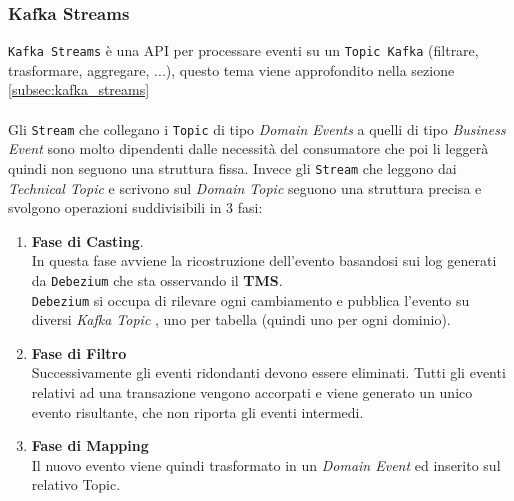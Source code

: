 \subsubsection{Kafka Streams}
\label{subsubsec:kafka_stream}
\texttt{Kafka Streams} è una API per processare eventi su un \texttt{Topic Kafka} (filtrare, trasformare, aggregare, ...), questo tema viene approfondito nella sezione \ref{subsec:kafka_streams}\\
\\
Gli \texttt{Stream} che collegano i \texttt{Topic} di tipo \textit{Domain Events} a quelli di tipo \textit{Business Event} sono molto dipendenti dalle necessità del consumatore che poi li leggerà quindi non seguono una struttura fissa.
Invece gli \texttt{Stream} che leggono dai \textit{Technical Topic} e scrivono sul \textit{Domain Topic} seguono una struttura precisa e svolgono operazioni suddivisibili in 3 fasi:
\begin{enumerate}
    \item \textbf{Fase di Casting}.\\
    In questa fase avviene la ricostruzione dell'evento basandosi sui log generati da \texttt{Debezium} che sta osservando il \textbf{TMS}.\\
    \texttt{Debezium} si occupa di rilevare ogni cambiamento e pubblica l'evento su diversi \textit{Kafka Topic} , uno per tabella (quindi uno per ogni dominio). 
    \item \textbf{Fase di Filtro}\\
    Successivamente gli eventi ridondanti devono essere eliminati. Tutti gli eventi relativi ad una transazione vengono accorpati e viene generato un unico evento risultante, che non riporta gli eventi intermedi. 
    \item \textbf{Fase di Mapping}\\
    Il nuovo evento viene quindi trasformato in un \textit{Domain Event} ed inserito sul relativo Topic.
\end{enumerate}

